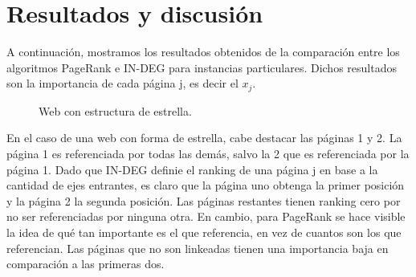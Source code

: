 \section{Resultados y discusión}
A continuación, mostramos los resultados obtenidos de la comparación entre los algoritmos PageRank e IN-DEG para instancias particulares. Dichos resultados son la importancia de cada página j, es decir el $x_{j}$. \\

\begin{figure}[H]
\centering     %
{}
\caption{Web con estructura de estrella.}
\end{figure}

En el caso de una web con forma de estrella, cabe destacar las páginas 1 y 2. La página 1 es referenciada por todas las demás, salvo la 2 que es referenciada por la página 1. Dado que IN-DEG definie el ranking de una página j en base a la cantidad de ejes entrantes, es claro que la página uno obtenga la primer posición y la página 2 la segunda posición. Las páginas restantes tienen ranking cero por no ser referenciadas por ninguna otra.
En cambio, para PageRank se hace visible la idea de qué tan importante es el que referencia, en vez de cuantos son los que referencian. Las páginas que no son linkeadas tienen una importancia baja en comparación a las primeras dos.


